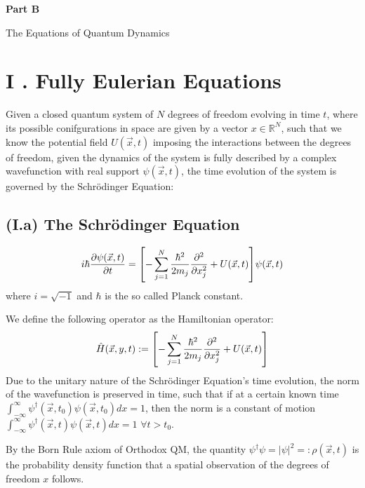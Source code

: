\documentclass[11pt, a4paper]{article} %
\newcommand{\R}{\mathbb{R}} %
\newenvironment{kapituloBerria}[1][]
  {\clearpage           %
   \thispagestyle{empty}%
   \vspace*{\stretch{2}}%
   \raggedleft          %
   {\textbf{{\fontsize{60}{40}\selectfont \hspace{+9.5cm}#1\newline \newline}}}
   \bf
   \fontsize{30}{20}\selectfont
  }
  {\par %
   \vspace{\stretch{3}} %
   \clearpage           %
  }
\begin{document}
\newpage

\begin{kapituloBerria}[Part B]
The Equations of Quantum Dynamics
\end{kapituloBerria}


\section*{I . Fully Eulerian Equations}
Given a closed quantum system of $N$ degrees of freedom evolving in time $t$, where its possible conifgurations in space are given by a vector $x\in\R^N$, such that we know the potential field $U(\vec{x}, t)$ imposing the interactions between the degrees of freedom, given the dynamics of the system is fully described by a complex wavefunction with real support $\psi(\vec{x},t)$, the time evolution of the system is governed by the Schrödinger Equation:

\subsection*{(I.a) The Schrödinger Equation}
\begin{equation}\label{SE}
i\hbar \pdv{\psi(\vec{x},t)}{t} = \qty[-\sum_{j=1}^N\frac{\hbar^2}{2m_j}\pdv[2]{}{x_j} + U(\vec{x},t)]\psi(\vec{x},t)
\end{equation}
where $i=\sqrt{-1}$ and $\hbar$ is the so called Planck constant.

We define the following operator as the Hamiltonian operator:
\begin{equation}
\hat{H}(\vec{x}, y, t):=\qty[-\sum_{j=1}^N\frac{\hbar^2}{2m_j}\pdv[2]{}{x_j} + U(\vec{x},t)]
\end{equation}
Due to the unitary nature of the Schrödinger Equation's time evolution, the norm of the wavefunction is preserved in time, such that if at a certain known time $\int^\infty_{-\infty} \psi^\dagger(\vec{x},t_0)\psi(\vec{x},t_0)dx=1$, then the norm is a constant of motion $\int^\infty_{-\infty} \psi^\dagger(\vec{x},t)\psi(\vec{x},t)dx=1$ $\forall t>t_0$.

By the Born Rule axiom of Orthodox QM, the quantity $\psi^\dagger\psi=|\psi|^2=:\rho(\vec{x},t)$ is the probability density function that a spatial observation of the degrees of freedom $x$ follows.
\end{document}
